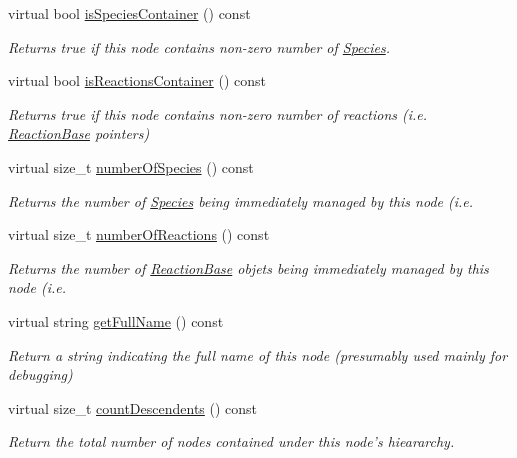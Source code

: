 \begin{DoxyCompactItemize}
virtual bool \hyperlink{classComponent_a0daf865ff32aff9e68316c65b681cbf9}{is\+Species\+Container} () const 
\begin{DoxyCompactList}\small\item\em Returns true if this node contains non-\/zero number of \hyperlink{classSpecies}{Species}. \end{DoxyCompactList}\item 
virtual bool \hyperlink{classComponent_a506e080028078ef9a753d854c60904a3}{is\+Reactions\+Container} () const 
\begin{DoxyCompactList}\small\item\em Returns true if this node contains non-\/zero number of reactions (i.\+e. \hyperlink{classReactionBase}{Reaction\+Base} pointers) \end{DoxyCompactList}\item 
virtual size\+\_\+t \hyperlink{classComponent_ae99bcb165a9403e64ffea2b840192b4c}{number\+Of\+Species} () const 
\begin{DoxyCompactList}\small\item\em Returns the number of \hyperlink{classSpecies}{Species} being immediately managed by this node (i.\+e. \end{DoxyCompactList}\item 
virtual size\+\_\+t \hyperlink{classComponent_a116a02dd48baa6bf46c1162998548814}{number\+Of\+Reactions} () const 
\begin{DoxyCompactList}\small\item\em Returns the number of \hyperlink{classReactionBase}{Reaction\+Base} objets being immediately managed by this node (i.\+e. \end{DoxyCompactList}\item 
virtual string \hyperlink{classComponent_a42dd891a934150f6d6ef74b9850d4b5c}{get\+Full\+Name} () const 
\begin{DoxyCompactList}\small\item\em Return a string indicating the full name of this node (presumably used mainly for debugging) \end{DoxyCompactList}\item 
virtual size\+\_\+t \hyperlink{classComponent_a38336c92dacb78175dfc7746bde5055d}{count\+Descendents} () const 
\begin{DoxyCompactList}\small\item\em Return the total number of nodes contained under this node's hieararchy. \end{DoxyCompactList}\item 

\end{DoxyCompactItemize}
